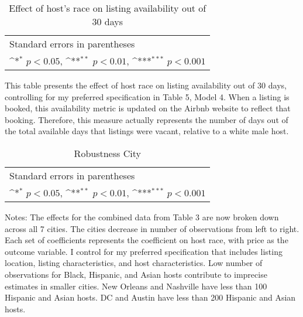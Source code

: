 \documentclass[11pt, oneside]{article}
\begin{document}
\begin{table}[htbp]\centering
	\def\sym#1{\ifmmode^{#1}\else\(^{#1}\)\fi}
	\caption{Effect of host’s race on listing availability out of 30 days}
	\begin{tabular}{l*{1}{c}}
		\hline\hline
		
		\hline\hline
		\multicolumn{2}{l}{\footnotesize Standard errors in parentheses}\\
		\multicolumn{2}{l}{\footnotesize \sym{*} \(p<0.05\), \sym{**} \(p<0.01\), \sym{***} \(p<0.001\)}\\
	\end{tabular}
	
	\begin{tablenotes}
		
		\item This table presents the effect of host race on listing availability out of 30 days, controlling for my preferred specification in Table 5, Model 4. When a listing is booked, this availability metric is updated on the Airbnb website to reflect that booking. Therefore, this measure actually represents the number of days out of the total available days that listings were vacant, relative to a white male host.
	\end{tablenotes}
\end{table}

\newpage
	\begin{table}[htbp]\centering
		\def\sym#1{\ifmmode^{#1}\else\(^{#1}\)\fi}
		\caption{Robustness City}
		\begin{tabular}{l*{7}{c}}
			\hline\hline
			
			\hline\hline
			\multicolumn{8}{l}{\footnotesize Standard errors in parentheses}\\
			\multicolumn{8}{l}{\footnotesize \sym{*} \(p<0.05\), \sym{**} \(p<0.01\), \sym{***} \(p<0.001\)}\\
		\end{tabular}
		\begin{tablenotes}

			\item Notes: The effects for the combined data from Table 3 are now broken down across all 7 cities. The cities decrease in number of observations from left to right. Each set of coefficients represents the coefficient on host race, with price as the outcome variable. I control for my preferred specification that includes listing location, listing characteristics, and host characteristics. Low number of observations for Black, Hispanic, and Asian hosts contribute to imprecise estimates in smaller cities. New Orleans and Nashville have less than 100 Hispanic and Asian hosts. DC and Austin have less than 200 Hispanic and Asian hosts. 
		\end{tablenotes}
	\end{table}
\end{document}

